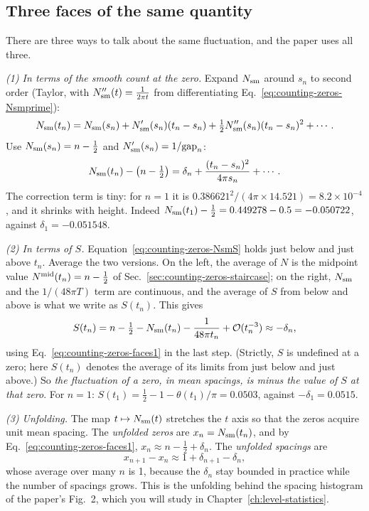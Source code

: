 \subsection{Three faces of the same quantity}

There are three ways to talk about the same fluctuation, and the paper uses all three.

\emph{(1) In terms of the smooth count at the zero.} Expand $N_{\mathrm{sm}}$ around $s_n$ to second order (Taylor, with $N_{\mathrm{sm}}''(t)=\frac{1}{2\pi t}$ from differentiating Eq.~\eqref{eq:counting-zeros-Nsmprime}):
\begin{equation}
N_{\mathrm{sm}}(t_n)=N_{\mathrm{sm}}(s_n)+N_{\mathrm{sm}}'(s_n)(t_n-s_n)+\tfrac12N_{\mathrm{sm}}''(s_n)(t_n-s_n)^2+\cdots.
\end{equation}
Use $N_{\mathrm{sm}}(s_n)=n-\tfrac12$ and $N_{\mathrm{sm}}'(s_n)=1/\mathrm{gap}_n$:
\begin{equation}
N_{\mathrm{sm}}(t_n)-\left(n-\tfrac12\right)=\delta_n+\frac{(t_n-s_n)^2}{4\pi s_n}+\cdots.
\label{eq:counting-zeros-faces1}
\end{equation}
The correction term is tiny: for $n=1$ it is $0.386621^2/(4\pi\times14.521)=8.2\times10^{-4}$, and it shrinks with height. Indeed $N_{\mathrm{sm}}(t_1)-\tfrac12=0.449278-0.5=-0.050722$, against $\delta_1=-0.051548$.

\emph{(2) In terms of $S$.} Equation~\eqref{eq:counting-zeros-NsmS} holds just below and just above $t_n$. Average the two versions. On the left, the average of $N$ is the midpoint value $N^{\rm mid}(t_n)=n-\tfrac12$ of Sec.~\ref{sec:counting-zeros-staircase}; on the right, $N_{\mathrm{sm}}$ and the $1/(48\pi T)$ term are continuous, and the average of $S$ from below and above is what we write as $S(t_n)$. This gives
\begin{equation}
S(t_n)=n-\tfrac12-N_{\mathrm{sm}}(t_n)-\frac{1}{48\pi t_n}+\mathcal{O}(t_n^{-3})\approx-\delta_n,
\label{eq:counting-zeros-faces2}
\end{equation}
using Eq.~\eqref{eq:counting-zeros-faces1} in the last step. (Strictly, $S$ is undefined at a zero; here $S(t_n)$ denotes the average of its limits from just below and just above.) So \emph{the fluctuation of a zero, in mean spacings, is minus the value of $S$ at that zero}. For $n=1$: $S(t_1)=\tfrac12-1-\theta(t_1)/\pi=0.0503$, against $-\delta_1=0.0515$.

\emph{(3) Unfolding.} The map $t\mapsto N_{\mathrm{sm}}(t)$ stretches the $t$ axis so that the zeros acquire unit mean spacing. The \emph{unfolded zeros} are $x_n=N_{\mathrm{sm}}(t_n)$, and by Eq.~\eqref{eq:counting-zeros-faces1}, $x_n\approx n-\tfrac12+\delta_n$. The \emph{unfolded spacings} are
\begin{equation}
x_{n+1}-x_n\approx1+\delta_{n+1}-\delta_n,
\end{equation}
whose average over many $n$ is 1, because the $\delta_n$ stay bounded in practice while the number of spacings grows. This is the unfolding behind the spacing histogram of the paper's Fig.~2, which you will study in Chapter~\ref{ch:level-statistics}.

